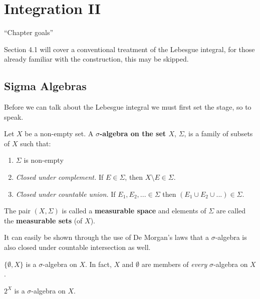\def\ind[#1]{\mathbb{I}_{#1}}
\def\extendedreal{\bar{\mathbb{R}}}
\def\hsetover[#1]{\mathbb{Z}^{#1}}

\chapter{Integration II} \label{integration}
\doublespacing

``Chapter goals''

Section 4.1 will cover a conventional treatment of the Lebesgue integral, for those already familiar with the construction, this may be skipped. 

%
%

\section{Sigma Algebras}

Before we can talk about the Lebesgue integral we must first set the stage, so to speak.



\begin{definition}
Let $X$ be a non-empty set. A \textbf{$\sigma$-algebra on the set $X$}, $\Sigma$,  is a family of subsets of $X$ such that:
\begin{enumerate}
\item $\Sigma$ is non-empty
\item \emph{Closed under complement.} If $E \in \Sigma$, then $X \setminus E \in \Sigma$.
\item \emph{Closed under countable union.} If $E_1, E_2, ... \in \Sigma$ then $(E_1 \cup E_2 \cup ... ) \in \Sigma$.
\end{enumerate}
The pair $(X, \Sigma)$ is called a \textbf{measurable space} and elements of $\Sigma$ are called the \textbf{measurable sets} (of $X$).
\end{definition}

It can easily be shown through the use of De Morgan's laws that a $\sigma$-algebra is also closed under countable intersection as well.
\begin{example}
$\{ \emptyset, X \}$ is a $\sigma$-algebra on $X$. In fact, $X$ and $\emptyset$ are members of \emph{every} $\sigma$-algebra on $X$.
\end{example}

\begin{example}
$2^X$ is a $\sigma$-algebra on $X$.
\end{example}

